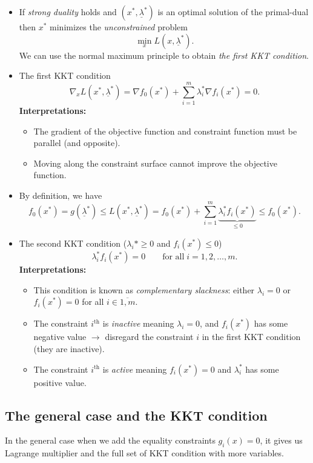 \begin{itemize}
    \item If \emph{strong duality} holds and $(x^*, \underline{\lambda}^*)$ is an optimal solution of the primal-dual then $x^*$ minimizes the \emph{unconstrained} problem
    \begin{equation*}
        \min_{x} L(x,\underline{\lambda}^*).
    \end{equation*}
    We can use the normal maximum principle to obtain \emph{the first KKT condition}.
    \item The first KKT condition
    \begin{equation*}
        \nabla_x L(x^*,\underline{\lambda}^*) = \nabla f_0(x^*) +  \sum_{i=1}^m \lambda_i^* \nabla f_i(x^*) =0.
    \end{equation*}
    \textbf{Interpretations:}
    \begin{itemize}
        \item The gradient of the objective
        function and constraint function must be parallel (and opposite). 
        \item Moving along the constraint surface cannot improve the objective function.
    \end{itemize}
    \item By definition, we have
    \begin{equation*}
        f_0(x^*) = g(\underline{\lambda}^*) \leq L(x^*, \underline{\lambda}^*) = f_0(x^*) + \sum_{i=1}^m \underbrace{\lambda_i^* f_i(x^*)}_{\leq 0} \leq f_0(x^*).
    \end{equation*}
    \item The second KKT condition ($\lambda_i*\geq 0$ and $f_i(x^*)\leq 0$)
    \begin{equation*}
        \lambda_i^* f_i(x^*) = 0 \qquad\text{for all}\; i=1,2,\ldots, m.
    \end{equation*}
    \textbf{Interpretations:}
    \begin{itemize}
        \item This condition is known as \emph{complementary slackness}: either $\lambda_i = 0$ or $f_i(x^*) = 0$ for all $i\in \overline{1,m}$.
        \item The constraint $i^{\text{th}}$ is \emph{inactive} meaning $\lambda_i = 0$, and $f_i(x^*)$ has some negative value $\longrightarrow$ disregard the constraint $i$ in the first KKT condition (they are inactive).
        \item The constraint $i^{\text{th}}$ is \emph{active} meaning $f_i(x^*) = 0$ and $\lambda_i^*$ has some positive value.
    \end{itemize}
\end{itemize}
\subsection{The general case and the KKT condition} In the general case when we add the equality constraints $g_i(x) = 0$, it gives us Lagrange multiplier and the full set of KKT condition with more variables.
